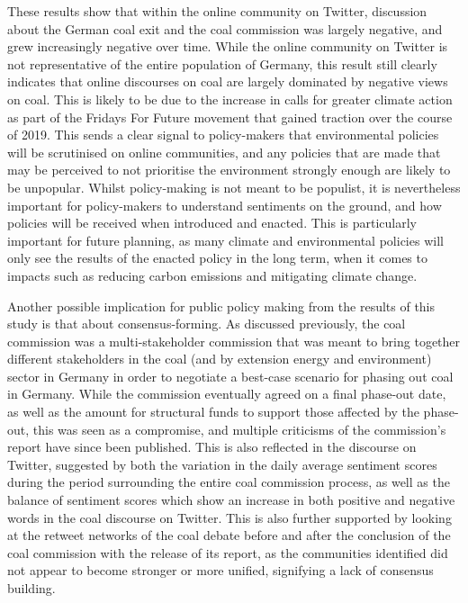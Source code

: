 \documentclass[12pt,onecolumn,twoside]{layout}
\begin{document}
These results show that within the online community on Twitter, discussion about the German coal exit and the coal commission was largely negative, and grew increasingly negative over time. While the online community on Twitter is not representative of the entire population of Germany, this result still clearly indicates that online discourses on coal are largely dominated by negative views on coal. This is likely to be due to the increase in calls for greater climate action as part of the Fridays For Future movement that gained traction over the course of 2019. This sends a clear signal to policy-makers that environmental policies will be scrutinised on online communities, and any policies that are made that may be perceived to not prioritise the environment strongly enough are likely to be unpopular. Whilst policy-making is not meant to be populist, it is nevertheless important for policy-makers to understand sentiments on the ground, and how policies will be received when introduced and enacted. This is particularly important for future planning, as many climate and environmental policies will only see the results of the enacted policy in the long term, when it comes to impacts such as reducing carbon emissions and mitigating climate change.

Another possible implication for public policy making from the results of this study is that about consensus-forming. As discussed previously, the coal commission was a multi-stakeholder commission that was meant to bring together different stakeholders in the coal (and by extension energy and environment) sector in Germany in order to negotiate a best-case scenario for phasing out coal in Germany. While the commission eventually agreed on a final phase-out date, as well as the amount for structural funds to support those affected by the phase-out, this was seen as a compromise, and multiple criticisms of the commission's report have since been published. This is also reflected in the discourse on Twitter, suggested by both the variation in the daily average sentiment scores during the period surrounding the entire coal commission process, as well as the balance of sentiment scores which show an increase in both positive and negative words in the coal discourse on Twitter. This is also further supported by looking at the retweet networks of the coal debate before and after the conclusion of the coal commission with the release of its report, as the communities identified did not appear to become stronger or more unified, signifying a lack of consensus building.
\end{document}
